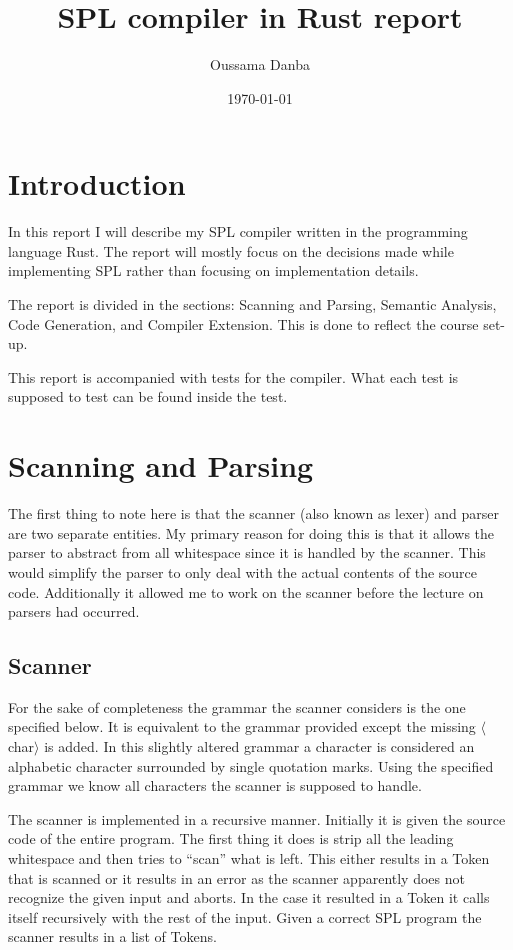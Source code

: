 \documentclass{article}
\title{SPL compiler in Rust report}
\author{Oussama Danba}
\date{\today}
\begin{document}
\maketitle

\section{Introduction}
In this report I will describe my SPL compiler written in the programming language Rust. The report will mostly focus on the decisions made while implementing SPL rather than focusing on implementation details.

The report is divided in the sections: Scanning and Parsing, Semantic Analysis, Code Generation, and Compiler Extension. This is done to reflect the course set-up.

This report is accompanied with tests for the compiler. What each test is supposed to test can be found inside the test.

\section{Scanning and Parsing}
The first thing to note here is that the scanner (also known as lexer) and parser are two separate entities. My primary reason for doing this is that it allows the parser to abstract from all whitespace since it is handled by the scanner. This would simplify the parser to only deal with the actual contents of the source code. Additionally it allowed me to work on the scanner before the lecture on parsers had occurred.

\subsection{Scanner}
For the sake of completeness the grammar the scanner considers is the one specified below. It is equivalent to the grammar provided except the missing $\langle$char$\rangle$ is added. In this slightly altered grammar a character is considered an alphabetic character surrounded by single quotation marks. Using the specified grammar we know all characters the scanner is supposed to handle.

The scanner is implemented in a recursive manner. Initially it is given the source code of the entire program. The first thing it does is strip all the leading whitespace and then tries to ``scan'' what is left. This either results in a Token that is scanned or it results in an error as the scanner apparently does not recognize the given input and aborts. In the case it resulted in a Token it calls itself recursively with the rest of the input. Given a correct SPL program the scanner results in a list of Tokens.
\end{document}
